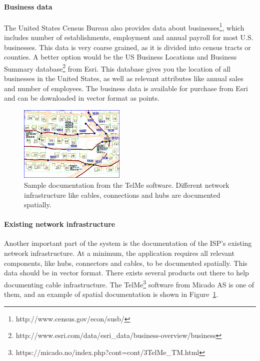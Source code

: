 \documentclass[twocolumn]{article}
\begin{document}
\paragraph{Business data}
\label{par:Business data}
The United States Census Bureau also provides data about businesses\footnote{http://www.census.gov/econ/susb/}, which includes number of establishments, employment and annual payroll for most U.S. businesses. This data is very coarse grained, as it is divided into census tracts or counties. A better option would be the US Business Locations and Business Summary database\footnote{http://www.esri.com/data/esri\_data/business-overview/business} from Esri. This database gives you the location of all businesses in the United States, as well as relevant attributes like annual sales and number of employees. The business data is available for purchase from Esri and can be downloaded in vector format as points.

\begin{figure}
  \centering
  \includegraphics[width=0.45\textwidth]{img/telme.png}
  \caption{Sample documentation from the TelMe software. Different network infrastructure like cables, connections and hubs are documented spatially.}
  \label{fig:telme}
\end{figure}
\paragraph{Existing network infrastructure}
\label{par:Existing network infrastructure}
Another important part of the system is the documentation of the ISP's existing network infrastructure. At a minimum, the application requires all relevant components, like hubs, connectors and cables, to be documented spatially. This data should be in vector format. There exists several products out there to help documenting cable infrastructure. The TelMe\footnote{https://micado.no/index.php?cont=cont/3TelMe\_TM.html} software from Micado AS is one of them, and an example of spatial documentation is shown in Figure~\ref{fig:telme}.
\end{document}
